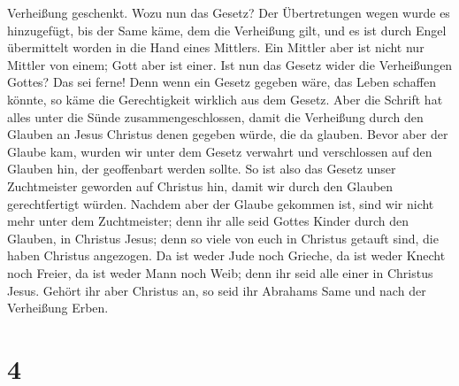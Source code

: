 Verheißung geschenkt.  Wozu nun das Gesetz? Der
Übertretungen wegen wurde es hinzugefügt, bis der Same käme, dem die
Verheißung gilt, und es ist durch Engel übermittelt worden in die Hand
eines Mittlers.  Ein Mittler aber ist nicht nur Mittler
von einem; Gott aber ist einer.  Ist nun das Gesetz wider
die Verheißungen Gottes? Das sei ferne! Denn wenn ein Gesetz gegeben
wäre, das Leben schaffen könnte, so käme die Gerechtigkeit wirklich aus
dem Gesetz.  Aber die Schrift hat alles unter die Sünde
zusammengeschlossen, damit die Verheißung durch den Glauben an Jesus
Christus denen gegeben würde, die da glauben.  Bevor aber
der Glaube kam, wurden wir unter dem Gesetz verwahrt und verschlossen
auf den Glauben hin, der geoffenbart werden sollte.  So
ist also das Gesetz unser Zuchtmeister geworden auf Christus hin, damit
wir durch den Glauben gerechtfertigt würden.  Nachdem
aber der Glaube gekommen ist, sind wir nicht mehr unter dem
Zuchtmeister;  denn ihr alle seid Gottes Kinder durch den
Glauben, in Christus Jesus;  denn so viele von euch in
Christus getauft sind, die haben Christus angezogen.  Da
ist weder Jude noch Grieche, da ist weder Knecht noch Freier, da ist
weder Mann noch Weib; denn ihr seid alle einer in Christus Jesus.
 Gehört ihr aber Christus an, so seid ihr Abrahams Same
und nach der Verheißung Erben.

\hypertarget{section-3}{%
\section{4}\label{section-3}}


